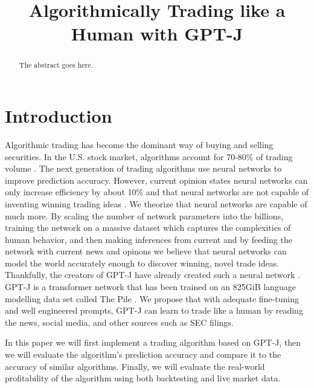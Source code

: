 \documentclass[conference]{IEEEtran}
\begin{document}
\title{Algorithmically Trading like a Human with GPT-J}

\author{
}

\maketitle


\begin{abstract}
The abstract goes here.
\end{abstract}
\section{Introduction}
Algorithmic trading has become the dominant way of buying and selling securities. In the U.S. stock market, algorithms account for 70-80\% of trading volume \cite{Samuelsson2021}. The next generation of trading algorithms use neural networks to improve prediction accuracy. However, current opinion states neural networks can only increase efficiency by about 10\% and that neural networks are not capable of inventing winning trading ideas \cite{Vonko2021}. We theorize that neural networks are capable of much more. By scaling the number of network parameters into the billions, training the network on a massive dataset which captures the complexities of human behavior, and then making inferences from current  and by feeding the network with current news and opinons we believe that neural networks can model the world accurately enough to discover winning, novel trade ideas. Thankfully, the creators of GPT-J have already created such a neural network \cite{mesh-transformer-jax}. GPT-J is a transformer network \cite{Vaswani2017} that has been trained on an 825GiB language modelling data set called The Pile \cite{Gao2021}. We propose that with adequate fine-tuning and well engineered prompts, GPT-J can learn to trade like a human by reading the news, social media, and other sources such as SEC filings.

In this paper we will first implement a trading algorithm based on GPT-J, then we will evaluate the algorithm's prediction accuracy and compare it to the accuracy of similar algorithms. Finally, we will evaluate the real-world profitability of the algorithm using both backtesting and live market data. 
\end{document}
